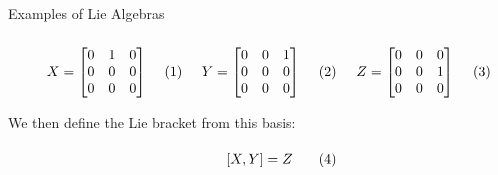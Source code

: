 \begin{lexample}{Examples of Lie Algebras}
\begin{subequations}
\begin{minipage}[b]{0.32\textwidth}
                \begin{equation}
                    X=\begin{bmatrix}
                        0&1&0\\
                        0&0&0\\
                        0&0&0
                    \end{bmatrix}
                \end{equation}
            \end{minipage}
            \hfill
            \begin{minipage}[b]{0.32\textwidth}
                \begin{equation}
                    Y=\begin{bmatrix}
                        0&0&1\\
                        0&0&0\\
                        0&0&0
                    \end{bmatrix}
                \end{equation}
            \end{minipage}
            \hfill
            \begin{minipage}[b]{0.32\textwidth}
                \begin{equation}
                    Z=\begin{bmatrix}
                        0&0&0\\
                        0&0&1\\
                        0&0&0
                    \end{bmatrix}
                \end{equation}
            \end{minipage}
        \end{subequations}
        \par\vspace{2.5ex}
        We then define the Lie bracket from this basis:
        \par\hfill\par
        \begin{subequations}
            \begin{minipage}[b]{0.32\textwidth}
                \begin{equation}
                    [X,Y]=Z
                \end{equation}
            \end{minipage}
            \hfill
            \begin{minipage}[b]{0.32\textwidth}

\end{minipage}
\end{subequations}
\end{lexample}
